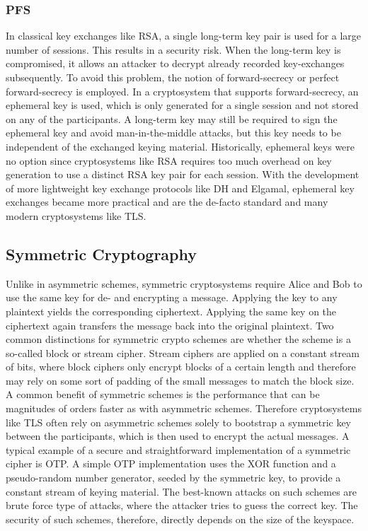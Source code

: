 \subsubsection{\texorpdfstring{\acf{PFS}}{PFS}}

In classical key exchanges like \ac{RSA}, a single long-term key pair is used for a large number of sessions. This results in a security risk. When the long-term key is compromised, it allows an attacker to decrypt already recorded key-exchanges subsequently. To avoid this problem, the notion of forward-secrecy or perfect forward-secrecy is employed. In a cryptosystem that supports forward-secrecy, an ephemeral key is used, which is only generated for a single session and not stored on any of the participants. A long-term key may still be required to sign the ephemeral key and avoid man-in-the-middle attacks, but this key needs to be independent of the exchanged keying material. Historically, ephemeral keys were no option since cryptosystems like \ac{RSA} requires too much overhead on key generation to use a distinct \ac{RSA} key pair for each session. With the development of more lightweight key exchange protocols like \ac{DH} and Elgamal, ephemeral key exchanges became more practical and are the de-facto standard and many modern cryptosystems like TLS.

\subsection{Symmetric Cryptography}

Unlike in asymmetric schemes, symmetric cryptosystems require Alice and Bob to use the same key for de- and encrypting a message. Applying the key to any plaintext yields the corresponding ciphertext. Applying the same key on the ciphertext again transfers the message back into the original plaintext. Two common distinctions for symmetric crypto schemes are whether the scheme is a so-called block or stream cipher. Stream ciphers are applied on a constant stream of bits, where block ciphers only encrypt blocks of a certain length and therefore may rely on some sort of padding of the small messages to match the block size. A common benefit of symmetric schemes is the performance that can be magnitudes of orders faster as with asymmetric schemes. Therefore cryptosystems like TLS often rely on asymmetric schemes solely to bootstrap a symmetric key between the participants, which is then used to encrypt the actual messages. A typical example of a secure and straightforward implementation of a symmetric cipher is \acl{OTP}. A simple \ac{OTP} implementation uses the XOR function and a pseudo-random number generator, seeded by the symmetric key, to provide a constant stream of keying material. The best-known attacks on such schemes are brute force type of attacks, where the attacker tries to guess the correct key. The security of such schemes, therefore, directly depends on the size of the keyspace.


